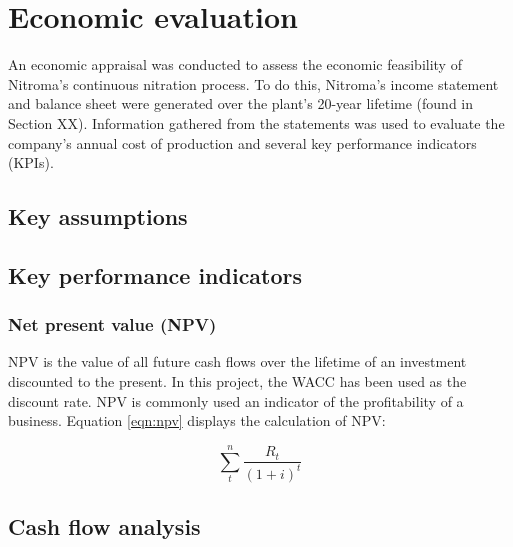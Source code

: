 \section{Economic evaluation}
An economic appraisal was conducted to assess the economic feasibility of Nitroma’s continuous nitration process. To do this, Nitroma’s income statement and balance sheet were generated over the plant’s 20-year lifetime (found in Section XX). Information gathered from the statements was used to evaluate the company’s annual cost of production and several key performance indicators (KPIs).

\subsection{Key assumptions}

\subsection{Key performance indicators}

\subsubsection{Net present value (NPV)}
NPV is the value of all future cash flows over the lifetime of an investment discounted to the present. In this project, the WACC has been used as the discount rate. NPV is commonly used an indicator of the profitability of a business. Equation \ref{eqn:npv} displays the calculation of NPV:

\begin{equation}
\label{eqn:npv}
    \sum_t^n\frac{R_{t}}{(1+i)^{t}}
\end{equation}


\subsection{Cash flow analysis}
